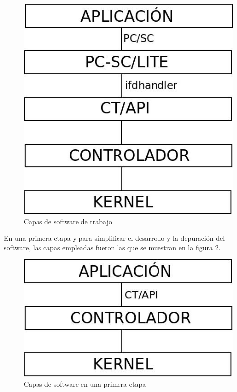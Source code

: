 \begin{figure}[H]
\centering
  \begin{center}
  \includegraphics[scale=.4]{Imagenes/SW_sc1.jpg} 
  \end{center}
  \caption{Capas de software de trabajo}\label{Fig:capas} 
\end{figure}

En una primera etapa y para simplificar el desarrollo y la depuración del software, las capas empleadas fueron las que se muestran en la figura \ref{Fig:capas0}.


\begin{figure}[H]
\centering
  \begin{center}
  \includegraphics[scale=.4]{Imagenes/SW_sc2.jpg} 
  \end{center}
  \caption{Capas de software en una primera etapa}\label{Fig:capas0} 
\end{figure}

